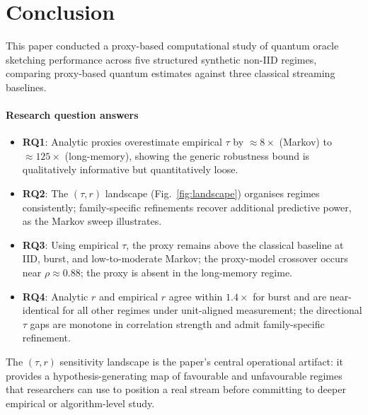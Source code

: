 \documentclass[preprint,12pt,authoryear]{elsarticle}
\begin{document}
\section{Conclusion}
\label{sec:conclusion}

This paper conducted a proxy-based computational study of quantum oracle sketching performance across five structured synthetic non\nobreakdash-IID regimes, comparing proxy-based quantum estimates against three classical streaming baselines.

\paragraph{Research question answers}
\begin{itemize}
    \item \textbf{RQ1}: Analytic proxies overestimate empirical $\tau$ by $\approx 8\times$ (Markov) to $\approx 125\times$ (long-memory), showing the generic robustness bound is qualitatively informative but quantitatively loose.
    \item \textbf{RQ2}: The $(\tau, r)$ landscape (Fig.~\ref{fig:landscape}) organises regimes consistently; family-specific refinements recover additional predictive power, as the Markov sweep illustrates.
    \item \textbf{RQ3}: Using empirical $\tau$, the proxy remains above the classical baseline at IID, burst, and low-to-moderate Markov; the proxy-model crossover occurs near $\rho \approx 0.88$; the proxy is absent in the long-memory regime.
    \item \textbf{RQ4}: Analytic $r$ and empirical $r$ agree within $1.4\times$ for burst and are near-identical for all other regimes under unit-aligned measurement; the directional $\tau$ gaps are monotone in correlation strength and admit family-specific refinement.
\end{itemize}

The $(\tau, r)$ sensitivity landscape is the paper's central operational artifact: it provides a hypothesis-generating map of favourable and unfavourable regimes that researchers can use to position a real stream before committing to deeper empirical or algorithm-level study.
\end{document}
